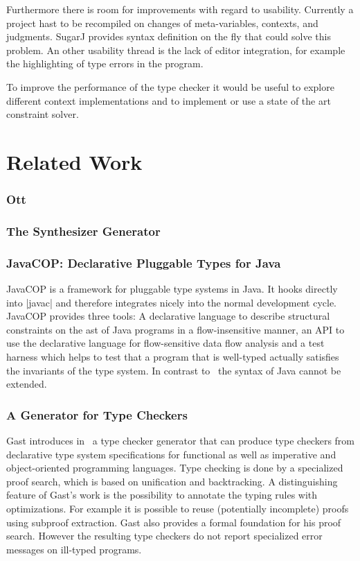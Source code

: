 Furthermore there is room for improvements with regard to
usability. Currently a project hast to be recompiled on changes of
meta-variables, contexts, and judgments. SugarJ\cite{erdweg2011sugarj}
provides syntax definition on the fly that could solve this
problem. An other usability thread is the lack of editor integration,
for example the highlighting of type errors in the program.

To improve the performance of the type checker it would be useful to
explore different context implementations and to implement or use a
state of the art constraint solver.
\section{Related Work}
\subsubsection{Ott}
\subsubsection{The Synthesizer Generator}
\subsubsection{JavaCOP: Declarative Pluggable Types for Java}
JavaCOP \cite{Markstrum:2010:JDP:1667048.1667049} is a framework for
pluggable type systems in Java. It hooks directly into \code|javac|
and therefore integrates nicely into the normal development
cycle. JavaCOP provides three tools: A declarative language to
describe structural constraints on the \gls{ast} of Java programs in a
flow-insensitive manner, an API to use the declarative language for
flow-sensitive data flow analysis and a test harness which helps to
test that a program that is well-typed actually satisfies the
invariants of the type system. In contrast to~\cite{bergan2007typmix}
the syntax of Java cannot be extended.


\subsubsection{A Generator for Type Checkers}
Gast introduces in~\cite{gast2005generator} a type checker generator
that can produce type checkers from declarative type system
specifications for functional as well as imperative and
object-oriented programming languages. Type checking is done by a
specialized proof search, which is based on unification and
backtracking. A distinguishing feature of Gast's work is the
possibility to annotate the typing rules with optimizations. For
example it is possible to reuse (potentially incomplete) proofs using
subproof extraction. Gast also provides a formal foundation for his
proof search. However the resulting type checkers do not report
specialized error messages on ill-typed programs.

